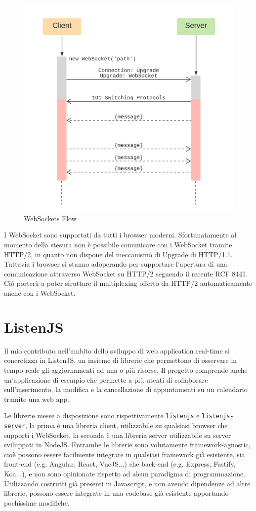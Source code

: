 \documentclass[12pt,a4paper,openright,twoside]{report}
\begin{document}
\begin{figure}[!htbp]
\centering
\includegraphics[width=.5\textwidth]{assets/websockets.png}
\caption{WebSockets Flow}
\label{fig:websockets}
\end{figure}
I WebSocket sono supportati da tutti i browser moderni. 
Sfortunatamente al momento della stesura non è possibile comunicare con i WebSocket tramite HTTP/2, in quanto non dispone del meccanismo di Upgrade di HTTP/1.1. Tuttavia i browser si stanno adoperando per supportare l'apertura di una comunicazione attraverso WebSocket su HTTP/2 seguendo il recente RCF 8441\cite{websockets_http2_rfc}. Ciò porterà a poter sfruttare il multiplexing offerto da HTTP/2 automaticamente anche con i WebSocket.
\chapter{ListenJS}
Il mio contributo nell'ambito dello sviluppo di web application real-time si concretizza in ListenJS, un insieme di librerie che permettono di osservare in tempo reale gli aggiornamenti ad una o più risorse.
Il progetto comprende anche un'applicazione di esempio che permette a più utenti di collaborare sull'inserimento, la modifica e la cancellazione di appuntamenti su un calendario tramite una web app.

\bigskip

Le librerie messe a disposizione sono rispettivamente \lstinline{listenjs} e \lstinline{listenjs-server}, la prima è una libreria client, utilizzabile su qualsiasi browser che supporti i WebSocket, la seconda è una libreria server utilizzabile su server sviluppati in NodeJS.
Entrambe le librerie sono volutamente framework-agnostic, cioè possono essere facilmente integrate in qualsiasi framework già esistente, sia front-end (e.g. Angular, React, VueJS...) che back-end (e.g. Express, Fastify, Koa...), e non sono opinionate rispetto ad alcun paradigma di programmazione. Utilizzando costrutti già presenti in Javascript, e non avendo dipendenze ad altre librerie, possono essere integrate in una codebase già esistente apportando pochissime modifiche.
\end{document}
